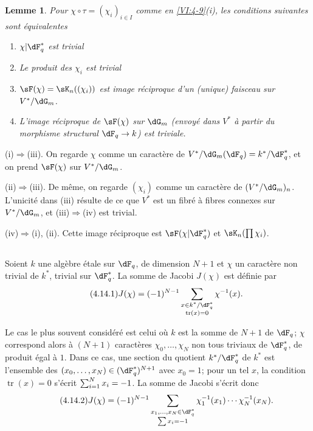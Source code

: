 \documentclass[oneside]{book}
\DeclareMathOperator{\tr}{tr}
\theoremstyle{sga-source}
\theoremstyle{sga-source-dash}
\theoremstyle{sga-source-dotdash}
\theoremstyle{sga-source-number-note-dash}
\theoremstyle{sga-source-note-number-dotdash}
\theoremstyle{sga-source-example-dotdash}
\theoremstyle{sga-source-inline-number}
\theoremstyle{sga-source-bare-number}
\theoremstyle{sga-source}
\newtheorem{lemma_}[subsection]{Lemme}
\begin{document}
\begin{lemma_}\label{VI:4-13}
Pour $\chi\circ \tau=(\chi_i)_{i\in I}$ comme en \ref{VI:4-9}(i), les
conditions suivantes sont équivalentes 
\begin{enumerate}[\indent (i)]
  \item $\chi| \dF_q^\ast$ est trivial 
  \item Le produit des $\chi_i$ est trivial 
  \item $\sF(\chi) = \sK_n((\chi_i))$ est image réciproque d'un (unique) 
    faisceau sur $V^\ast/\dG_m$. 
  \item L'image réciproque de $\sF(\chi)$ sur $\dG_m$ (envoyé dans 
    $V^\ast$ à partir du morphisme structural $\dF_q \to k$) est triviale. 
\end{enumerate}
\end{lemma_}

(i)$\Rightarrow$(iii). On regarde $\chi$ comme un caractère de 
$V^\ast/\dG_m(\dF_q)=k^\ast/\dF_q^\ast$, et on prend $\sF(\chi)$ sur 
$V^\ast/\dG_m$. 

(ii)$\Rightarrow$(iii). De même, on regarde $(\chi_i)$ comme un caractère 
de $(V^\ast/\dG_m)_n$. L'unicité dans (iii) résulte de ce que $V^\ast$ est 
un fibré à fibres connexes sur $V^\ast/\dG_m$, et (iii)$\Rightarrow$(iv)  
est trivial. 

(iv)$\Rightarrow$(i), (ii). Cette image réciproque est 
$\sF(\chi|\dF_q^\ast)$ et $\sK_n(\prod \chi_i)$. 





\subsection{}\label{VI:4-14}

Soient $k$ une algèbre étale sur $\dF_q$, de 
dimension $N+1$ et $\chi$ un caractère non trivial de $k^\ast$, trivial sur 
$\dF_q^\ast$. La somme de Jacobi $J(\chi)$ est définie par 
\begin{equation*}\tag{4.14.1}\label{VI:eq:4-14-1}
  J(\chi) = (-1)^{N-1} \sum_{\substack{x\in k^\ast/\dF_q^\ast \\ \tr(x)=0}} \chi^{-1}(x) \text{.} 
\end{equation*}

Le cas le plus souvent considéré est celui où $k$ est la somme de $N+1$
 de $\dF_q$; $\chi$ correspond alors à $(N+1)$ caractères
$\chi_0,\ldots,\chi_N$ non tous triviaux de $\dF_q^\ast$, de produit égal à $1$.
Dans ce cas, une section du quotient $k^\ast/\dF_q^\ast$ de $k^\ast$
est l'ensemble des $(x_0,\ldots,x_N)\in\var{(k^\ast)^{N+1}}{(\dF_q^\ast)^{N+1}}{S45-SOL-0839}$ avec $x_0=1$;
pour un tel $x$, la condition $\tr(x)=0$ s'écrit $\sum_{i=1}^{\var{n}{N}{S45-SOL-0840}}x_i=-1$.
La somme de Jacobi s'écrit donc
\begin{equation*}\tag{4.14.2}\label{VI:eq:4-14-2}
 J(\chi)=(-1)^{N-1}\sum_{\substack{x_1,\ldots,x_N\in\dF_q^\ast\\\sum x_i=-1}}
 \chi_1^{-1}(x_1)\cdots\var{\chi_n^{-1}(x_n)}{\chi_N^{-1}(x_N)}{S45-SOL-0841} \text{.}
\end{equation*}
\end{document}

